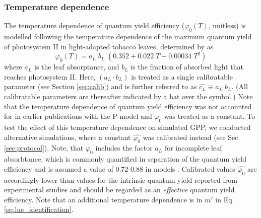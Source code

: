 \documentclass{myreport}
\begin{document}
\subsubsection{Temperature dependence}
\label{sec:tempstress}
The temperature dependence of quantum yield efficiency ($\varphi_0(T)$, unitless) is modelled following the temperature dependence of the maximum quantum yield of photosystem II in light-adapted tobacco leaves, determined by \cite{bernacchi03pce} as 
\begin{equation}
\varphi_0(T) = a_L \; b_L \; ( 0.352 + 0.022\;T - 0.00034\;T^2 )
\end{equation}
where $a_L$ is the leaf absorptance, and $b_L$ is the fraction of absorbed light that reaches photosystem II. Here, $(a_L \cdot b_L)$ is treated as a single calibratable parameter (see Section \ref{sec:calib}) and is further referred to as $\widehat{c_L}\equiv a_L\; b_L$. (All calibratable parameters are thereafter indicated by a hat over the symbol.) Note that the temperature dependence of quantum yield efficiency was not accounted for in earlier publications with the P-model \citep{keenan17natcomm, wang17natpl} and $\varphi_0$ was treated as a constant. To test the effect of this temperature dependence on simulated GPP, we conducted alternative simulations, where a constant $\widehat{\varphi_0}$ was calibrated instead (see Sec. \ref{sec:protocol}). Note, that $\varphi_0$  includes the factor $a_L$ for incomplete leaf absorbtance, which is commonly quantified in separation of the quantum yield efficiency and is assumed a value of 0.72-0.88 in models \citep{rogers17}. Calibrated values $\widehat{\varphi_0}$ are accordingly lower than values for the intrinsic quantum yield reported from experimental studies \citep{long93, singsaas01} and should be regarded as an \textit{effective} quantum yield efficiency. Note that an additional temperature dependence is in $m'$ in Eq. \ref{eq:lue_identification}.
\end{document}
